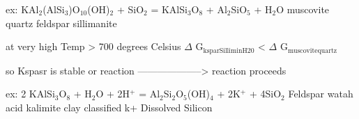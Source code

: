 \documentclass[11pt]{article}
\begin{document}
ex: KAl$_{\text{2}}$(AlSi$_{\text{3}}$)O$_{\text{10}}$(OH)$_{\text{2}}$ + SiO$_{\text{2}}$ =   KAlSi$_{\text{3}}$O$_{\text{8}}$  + Al$_{\text{2}}$SiO$_{\text{5}}$ +  H$_{\text{2}}$O
                muscovite              quartz        feldspar         sillimanite


at very high Temp > 700 degrees Celsius     \Sum $\Delta$ G$_{\text{ksparSilliminH20}}$ < \Sum $\Delta$ G$_{\text{muscovitequartz}}$

so Kspasr is stable or reaction -------------------->
                                  reaction proceeds


ex:
     2 KAlSi$_{\text{3}}$O$_{\text{8}}$ + H$_{\text{2}}$O + 2H$^{\text{+}}$ = Al$_{\text{2}}$Si$_{\text{2}}$O$_{\text{5}}$(OH)$_{\text{4}}$ + 2K$^{\text{+}}$ +         4SiO$_{\text{2}}$
        Feldspar         watah   acid        kalimite clay            classified k+    Dissolved Silicon
\end{document}
